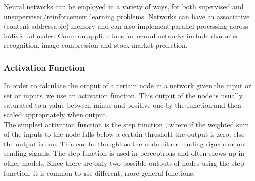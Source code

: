 \documentclass[11pt,a4paper]{article}
\begin{document}
Neural networks can be employed in a variety of ways, for both supervised and unsupervised/reinforcement learning problems. Networks can have an associative (content-addressable) memory and can also implement parallel processing across individual nodes. \cite{nnm} Common applications for neural networks include character recognition, image compression and stock market prediction. \cite{nnapps}
\begin{figure}[h]
\end{figure}
\newpage
\subsubsection*{Activation Function}
In order to calculate the output of a certain node in a network given the input or set or inputs, we use an activation function. \cite{activate} This output of the node is usually saturated to a value between minus and positive one by the function and then scaled appropriately when output. \cite{swarmann} \\

The simplest activation function is the step function \cite{nnm}, where if the weighted sum of the inputs to the node falls below a certain threshold the output is zero, else the output is one. This can be thought as the node either sending signals or not sending signals. The step function is used in perceptrons and often shows up in other models. \cite{percept} Since there are only two possible outputs of nodes using the step function, it is common to use different, more general functions.\\
\end{document}
